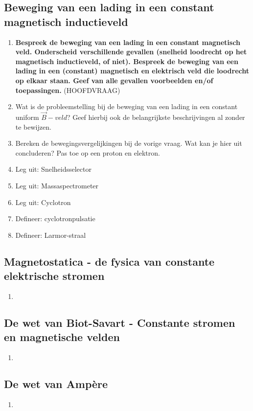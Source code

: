\documentclass[12pt]{article}
\begin{document}
    \subsection{Beweging van een lading in een constant magnetisch inductieveld}
    \begin{enumerate}
        \item \textbf{Bespreek de beweging van een lading in een constant magnetisch veld. Onderscheid verschillende gevallen (snelheid loodrecht op het magnetisch inductieveld, of niet). Bespreek de beweging van een lading in een (constant) magnetisch en elektrisch veld die loodrecht op elkaar staan. Geef van alle gevallen voorbeelden en/of toepassingen.} (HOOFDVRAAG)
        \item Wat is de probleemstelling bij de beweging van een lading in een constant uniform $\vec{B}-veld$? Geef hierbij ook de belangrijkste beschrijvingen al zonder te bewijzen.
        \item Bereken de bewegingsvergelijkingen bij de vorige vraag. Wat kan je hier uit concluderen? Pas toe op een proton en elektron.
        \item Leg uit: Snelheidsselector
        \item Leg uit: Massaspectrometer
        \item Leg uit: Cyclotron
        \item Defineer: cyclotronpulsatie
        \item Defineer: Larmor-straal
    \end{enumerate}
    \subsection{Magnetostatica - de fysica van constante elektrische stromen}
    \begin{enumerate}
        \item 
    \end{enumerate}
    \subsection{De wet van Biot-Savart - Constante stromen en magnetische velden}
    \begin{enumerate}
        \item 
    \end{enumerate}
    \subsection{De wet van Ampère}
    \begin{enumerate}
        \item 
    \end{enumerate}
\end{document}
